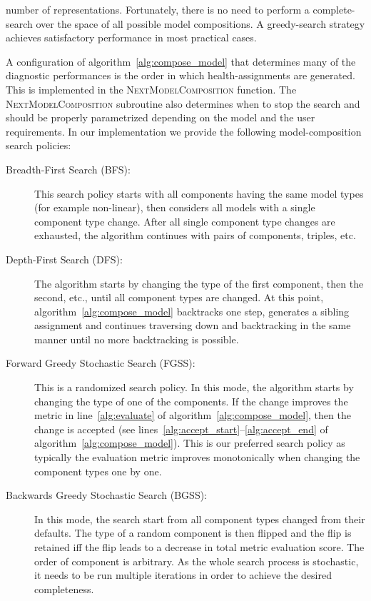 number of representations. Fortunately, there is no need to perform a
complete-search over the space of all possible model compositions. A
greedy-search strategy achieves satisfactory performance in most
practical cases.
\par
A configuration of algorithm~\ref{alg:compose_model} that determines
many of the diagnostic performances is the order in which
health-assignments are generated. This is implemented in the
\textsc{NextModelComposition} function. The
\textsc{NextModelComposition} subroutine also determines when to stop
the search and should be properly parametrized depending on the model
and the user requirements. In our implementation we provide the
following model-composition search policies:
%
\begin{description}
%
\item[Breadth-First Search (BFS):]
{
%
This search policy starts with all components having the same model
types (for example non-linear), then considers all models with a
single component type change. After all single component type changes
are exhausted, the algorithm continues with pairs of components,
triples, etc.
%
}
\item[Depth-First Search (DFS):]
{
%
The algorithm starts by changing the type of the first component, then
the second, etc., until all component types are changed. At this
point, algorithm~\ref{alg:compose_model} backtracks one step,
generates a sibling assignment and continues traversing down and
backtracking in the same manner until no more backtracking is
possible.
%
}
\item[Forward Greedy Stochastic Search (FGSS):]
{
%
This is a randomized search policy. In this mode, the algorithm starts
by changing the type of one of the components. If the change improves
the metric in line~\ref{alg:evaluate} of
algorithm~\ref{alg:compose_model}, then the change is accepted (see
lines~\ref{alg:accept_start}--\ref{alg:accept_end} of
algorithm~\ref{alg:compose_model}). This is our preferred search
policy as typically the evaluation metric improves monotonically when
changing the component types one by one.
%
}
\item[Backwards Greedy Stochastic Search (BGSS):]
{
%
In this mode, the search start from all component types changed from
their defaults. The type of a random component is then flipped and the
flip is retained iff the flip leads to a decrease in total metric
evaluation score. The order of component is arbitrary. As the whole
search process is stochastic, it needs to be run multiple iterations
in order to achieve the desired completeness.
%
}
%
\end{description}
